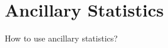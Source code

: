 \section{Ancillary Statistics}

How to use ancillary statistics? 
\begin{Definition}

\end{Definition}

